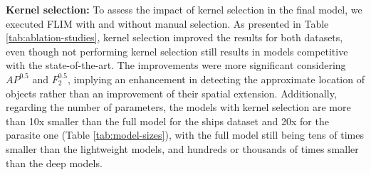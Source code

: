 \documentclass[10pt,twocolumn,twoside]{IEEEtran}
\begin{document}
    \textbf{Kernel selection:} 
   To assess the impact of kernel selection in the final model, we executed FLIM with and without manual selection. As presented in Table \ref{tab:ablation-studies}, kernel selection improved the results for both datasets, even though not performing kernel selection still results in models competitive with the state-of-the-art. The improvements were more significant considering $AP^{0.5}$ and $F_{2}^{0.5}$, implying an enhancement in detecting the approximate location of objects rather than an improvement of their spatial extension. Additionally, regarding the number of parameters, the models with kernel selection are more than 10x smaller than the full model for the ships dataset and 20x for the parasite one (Table \ref{tab:model-sizes}), with the full model still being tens of times smaller than the lightweight models, and hundreds or thousands of times smaller than the deep models.
    
\end{document}
